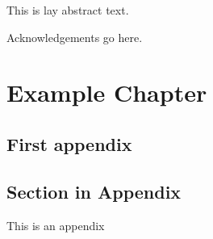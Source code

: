 \begin{abstract} %

put abstract here
  
\end{abstract}%
\clearpage



\begin{uomlay} %
  This is lay abstract text. 
  
\end{uomlay}



\uomdeclarations %






\begin{uomacknowledgements} %
Acknowledgements go here.
\end{uomacknowledgements}

\chapter{Example Chapter}\label{chap:example_chapter}



\printbibliography[title={References},heading=bibintoc] %



\begin{uomappendix} 
  \chapter{First appendix}
    \section{Section in Appendix}
    This is an appendix
\end{uomappendix}


